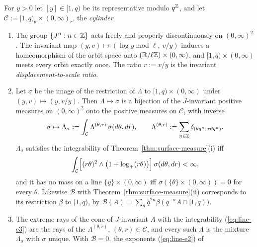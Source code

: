 \begin{theorem}
\label{thm:knot-atom-cascades}
\leanok
{}
For $y > 0$ let $[y] \in [1,q)$ be its representative modulo $q^{\mathbb{Z}}$, and let
$\mathcal{C} := [1,q)_\theta \times (0,\infty)_r$, the \emph{cylinder}.
\begin{enumerate}
\item The group $\{J^n : n \in \mathbb{Z}\}$ acts freely and properly discontinuously on $(0,\infty)^2$.
The invariant map $(y,v) \mapsto (\log y \operatorname{mod} \ell,\ v/y)$ induces a homeomorphism of the orbit
space onto $(\mathbb{R}/\ell\mathbb{Z}) \times (0,\infty)$, and $[1,q) \times (0,\infty)$ meets every orbit
exactly once. The ratio $r := v/y$ is the invariant \emph{displacement-to-scale ratio}.
\item Let $\sigma$ be the image of the restriction of $\Lambda$ to $[1,q) \times (0,\infty)$ under
$(y,v) \mapsto (y, v/y)$. Then $\Lambda \mapsto \sigma$ is a bijection of the $J$-invariant positive
measures on $(0,\infty)^2$ onto the positive measures on $\mathcal{C}$, with inverse
\[
  \sigma \mapsto \Lambda_\sigma := \int_{\mathcal{C}}\Lambda^{(\theta,r)}\,\sigma(d\theta,dr),
  \qquad \Lambda^{(\theta,r)} := \sum_{n \in \mathbb{Z}}\delta_{(\theta q^n,\, r\theta q^n)} .
\]
$\Lambda_\sigma$ satisfies the integrability of Theorem~\ref{thm:surface-measure}(i) iff
\begin{equation}\label{eq:line-e3}
  \int_{\mathcal{C}}\Bigl[(r\theta)^2 \wedge \bigl(1 + \log_+(r\theta)\bigr)\Bigr]\,
  \sigma(d\theta,dr) < \infty ,
\end{equation}
and it has no mass on a line $\{y\} \times (0,\infty)$ iff
$\sigma(\{\theta\} \times (0,\infty)) = 0$ for every $\theta$. Likewise $\mathcal{B}$ with
Theorem~\ref{thm:surface-measure}(ii) corresponds to its restriction $\beta$ to $[1,q)$, by
$\mathcal{B}(A) = \sum_nq^{2n}\beta(q^{-n}A \cap [1,q))$.
\item The extreme rays of the cone of $J$-invariant $\Lambda$ with the integrability (\ref{eq:line-e3}) are the
rays of the $\Lambda^{(\theta,r)}$, $(\theta,r) \in \mathcal{C}$, and every such $\Lambda$ is the
mixture $\Lambda_\sigma$ with $\sigma$ unique. With $\mathcal{B} = 0$, the exponents (\ref{eq:line-e2}) of

\end{enumerate}
\end{theorem}
